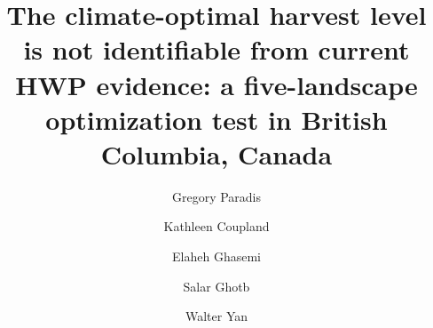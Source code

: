 \documentclass[preprint,12pt,authoryear]{elsarticle}
\begin{document}
\begin{frontmatter}



\title{The climate-optimal harvest level is not identifiable from current HWP evidence: a five-landscape optimization test in British Columbia, Canada}


\author[inst1]{Gregory Paradis}


\author[inst1]{Kathleen Coupland}
\author[inst1]{Elaheh Ghasemi}
\author[inst1]{Salar Ghotb}
\author[inst1]{Walter Yan}



\end{frontmatter}
\end{document}
